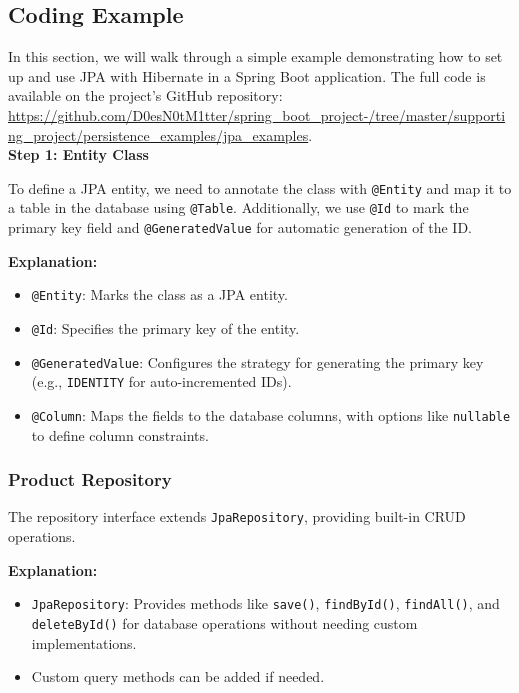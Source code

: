 \documentclass{article}
\begin{document}
\subsection{Coding Example}
In this section, we will walk through a simple example demonstrating how to set up and use JPA with Hibernate in a Spring Boot application. The full code is available on the project's GitHub repository:\\ \url{https://github.com/D0esN0tM1tter/spring_boot_project-/tree/master/supporting_project/persistence_examples/jpa_examples}.
\vspace{0.5cm}\\
\textbf{Step 1: Entity Class}

To define a JPA entity, we need to annotate the class with \texttt{@Entity} and map it to a table in the database using \texttt{@Table}. Additionally, we use \texttt{@Id} to mark the primary key field and \texttt{@GeneratedValue} for automatic generation of the ID.

\textbf{Explanation:}
\begin{itemize}
    \item \texttt{@Entity}: Marks the class as a JPA entity.
    \item \texttt{@Id}: Specifies the primary key of the entity.
    \item \texttt{@GeneratedValue}: Configures the strategy for generating the primary key (e.g., \texttt{IDENTITY} for auto-incremented IDs).
    \item \texttt{@Column}: Maps the fields to the database columns, with options like \texttt{nullable} to define column constraints.
\end{itemize}

\subsubsection{Product Repository}

The repository interface extends \texttt{JpaRepository}, providing built-in CRUD operations.

\textbf{Explanation:}
\begin{itemize}
    \item \texttt{JpaRepository}: Provides methods like \texttt{save()}, \texttt{findById()}, \texttt{findAll()}, and \texttt{deleteById()} for database operations without needing custom implementations.
    \item Custom query methods can be added if needed.
\end{itemize}
\end{document}
